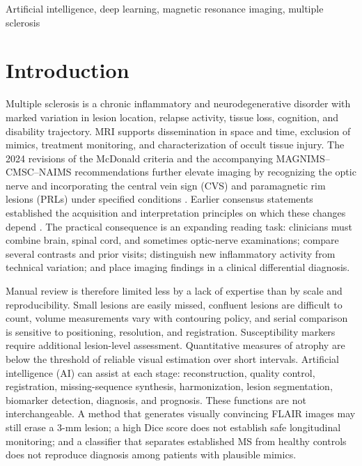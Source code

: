 \documentclass[journal,twoside,web]{ieeecolor}
\begin{document}
\begin{IEEEkeywords}
Artificial intelligence, deep learning, magnetic resonance imaging, multiple sclerosis
\end{IEEEkeywords}

\section{Introduction}\label{sec:introduction}

Multiple sclerosis is a chronic inflammatory and neurodegenerative disorder with marked variation in lesion location, relapse activity, tissue loss, cognition, and disability trajectory. MRI supports dissemination in space and time, exclusion of mimics, treatment monitoring, and characterization of occult tissue injury. The 2024 revisions of the McDonald criteria and the accompanying MAGNIMS--CMSC--NAIMS recommendations further elevate imaging by recognizing the optic nerve and incorporating the central vein sign (CVS) and paramagnetic rim lesions (PRLs) under specified conditions \cite{mcdonald2024,barkhof2024}. Earlier consensus statements established the acquisition and interpretation principles on which these changes depend \cite{magnims2016,wattjes2021}. The practical consequence is an expanding reading task: clinicians must combine brain, spinal cord, and sometimes optic-nerve examinations; compare several contrasts and prior visits; distinguish new inflammatory activity from technical variation; and place imaging findings in a clinical differential diagnosis.


Manual review is therefore limited less by a lack of expertise than by scale and reproducibility. Small lesions are easily missed, confluent lesions are difficult to count, volume measurements vary with contouring policy, and serial comparison is sensitive to positioning, resolution, and registration. Susceptibility markers require additional lesion-level assessment. Quantitative measures of atrophy are below the threshold of reliable visual estimation over short intervals. Artificial intelligence (AI) can assist at each stage: reconstruction, quality control, registration, missing-sequence synthesis, harmonization, lesion segmentation, biomarker detection, diagnosis, and prognosis. These functions are not interchangeable. A method that generates visually convincing FLAIR images may still erase a 3-mm lesion; a high Dice score does not establish safe longitudinal monitoring; and a classifier that separates established MS from healthy controls does not reproduce diagnosis among patients with plausible mimics.
\end{document}
